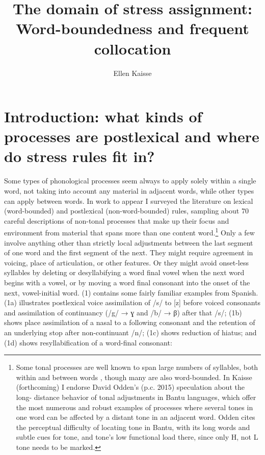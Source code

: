\documentclass[output=paper,
modfonts
]{LSP/langsci}
\title{The domain of stress assignment: Word-boundedness and frequent collocation}
\author{%
Ellen Kaisse\affiliation{University of Washington}
}
\begin{document}
\maketitle

\section{Introduction: what kinds of processes are postlexical and where do stress rules fit in?}
Some types of phonological processes seem always to apply solely within a single word, not taking into account any material in adjacent words, while other types can apply between words. In work to appear \citep{kaisseforthcoming} I surveyed the literature on lexical (word-bounded) and postlexical (non-word-bounded) rules, sampling about 70 careful descriptions of non-tonal processes that make up their focus and environment from material that spans more than one content word.\footnote{Some tonal processes are well known to span large numbers of syllables, both within and between words \citep{hyman2011}, though many are also word-bounded. In Kaisse (forthcoming) I endorse David Odden’s (p.c. 2015) speculation about the long- distance behavior of tonal adjustments in Bantu languages, which offer the most numerous and robust examples of processes where several tones in one word can be affected by a distant tone in an adjacent word. Odden cites the perceptual difficulty of locating tone in Bantu, with its long words and subtle cues for tone, and tone’s low functional load there, since only H, not L tone needs to be marked.} Only a few involve anything other than strictly local adjustments between the last segment of one word and the first segment of the next. They might require agreement in voicing, place of articulation, or other features. Or they might avoid onset-less syllables by deleting or desyllabifying a word final vowel when the next word begins with a vowel, or by moving a word final consonant into the onset of the next, vowel-initial word. (1) contains some fairly familiar examples from Spanish. (1a) illustrates postlexical voice assimilation of /s/ to [z] before voiced consonants and assimilation of continuancy (/g/ → ɣ and /b/ → β) after that /s/; (1b) shows place assimilation of a nasal to a following consonant and the retention of an underlying stop after non-continuant /n/; (1c) shows reduction of hiatus; and (1d) shows resyllabification of a word-final consonant:
\end{document}

